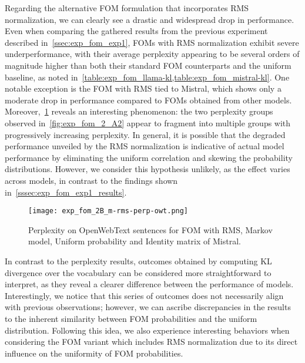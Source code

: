 
Regarding the alternative FOM formulation that incorporates RMS normalization, we can clearly see a drastic and widespread drop in performance.
Even when comparing the gathered results from the previous experiment described in~\cref{ssec:exp_fom_exp1}, FOMs with RMS normalization exhibit severe underperformance, with their average perplexity appearing to be several orders of magnitude higher than both their standard FOM counterparts and the uniform baseline, as noted in~\cref{table:exp_fom_llama-kl,table:exp_fom_mistral-kl}.
One notable exception is the FOM with RMS tied to Mistral, which shows only a moderate drop in performance compared to FOMs obtained from other models.
Moreover,~\cref{fig:exp_fom_2_B} reveals an interesting phenomenon: the two perplexity groups observed in~\cref{fig:exp_fom_2_A2} appear to fragment into multiple groups with progressively increasing perplexity.
In general, it is possible that the degraded performance unveiled by the RMS normalization is indicative of actual model performance by eliminating the uniform correlation and skewing the probability distributions.
However, we consider this hypothesis unlikely, as the effect varies across models, in contrast to the findings shown in~\cref{sssec:exp_fom_exp1_results}.

\begin{figure}[t!]
    \centering
    \texttt{[image: exp\_fom\_2B\_m-rms-perp-owt.png]}
    \caption{Perplexity on OpenWebText sentences for FOM with RMS, Markov model, Uniform probability and Identity matrix of Mistral.}
    \label{fig:exp_fom_2_B}
\end{figure}

In contrast to the perplexity results, outcomes obtained by computing KL divergence over the vocabulary can be considered more straightforward to interpret, as they reveal a clearer difference between the performance of models.
Interestingly, we notice that this series of outcomes does not necessarily align with previous observations; however, we can ascribe discrepancies in the results to the inherent similarity between FOM probabilities and the uniform distribution.
Following this idea, we also experience interesting behaviors when considering the FOM variant which includes RMS normalization due to its direct influence on the uniformity of FOM probabilities.

